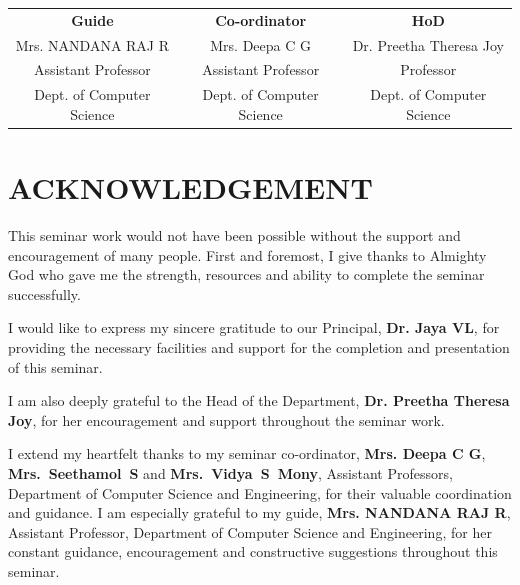 \documentclass[12pt,a4paper]{report}
\newcommand{\guidename}{Mrs. NANDANA RAJ R}
\newcommand{\coordinator}{Mrs. Deepa C G}
\newcommand{\hodname}{Dr. Preetha Theresa Joy}
\newcommand{\principalname}{Dr. Jaya VL}
\begin{document}
\vspace{1.2cm}
\begin{center}
\begin{tabular}{@{}c@{\hspace{0.45cm}}c@{\hspace{0.45cm}}c@{}}
\textbf{Guide} & \textbf{Co-ordinator} & \textbf{HoD}\\[0.75cm]

\parbox[c][0.55cm][c]{4.3cm}{\centering \guidename} &
\parbox[c][0.55cm][c]{4.3cm}{\centering \coordinator} &
\parbox[c][0.55cm][c]{4.3cm}{\centering \hodname}\\[0.25cm]

\parbox[c][0.45cm][c]{4.3cm}{\centering Assistant Professor} &
\parbox[c][0.45cm][c]{4.3cm}{\centering Assistant Professor} &
\parbox[c][0.45cm][c]{4.3cm}{\centering Professor}\\[0.25cm]

\parbox[c][1.35cm][c]{4.3cm}{\centering \small Dept. of Computer Science} &
\parbox[c][1.35cm][c]{4.3cm}{\centering \small Dept. of Computer Science} &
\parbox[c][1.35cm][c]{4.3cm}{\centering \small Dept. of Computer Science}

\end{tabular}
\end{center}

\newpage


\chapter*{ACKNOWLEDGEMENT}
This seminar work would not have been possible without the support and encouragement of many people. First and foremost, I give thanks to Almighty God who gave me the strength, resources and ability to complete the seminar successfully.

I would like to express my sincere gratitude to our Principal, \textbf{\principalname}, for providing the necessary facilities and support for the completion and presentation of this seminar.

I am also deeply grateful to the Head of the Department, \textbf{\hodname}, for her encouragement and support throughout the seminar work.

I extend my heartfelt thanks to my seminar co-ordinator, \textbf{\coordinator},\\\textbf{Mrs.~Seethamol~S} and \textbf{Mrs.~Vidya~S~Mony}, Assistant Professors, Department of Computer Science and Engineering, for their valuable coordination and guidance. I am especially grateful to my guide, \textbf{\guidename}, Assistant Professor, Department of Computer Science and Engineering, for her constant guidance, encouragement and constructive suggestions throughout this seminar.
\end{document}
